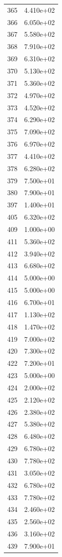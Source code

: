 \documentclass[12pt]{article}
\begin{document}
\begin{longtable}{@{}cc@{}}
365 & 4.410e+02 \\
366 & 6.050e+02 \\
367 & 5.580e+02 \\
368 & 7.910e+02 \\
369 & 6.310e+02 \\
370 & 5.130e+02 \\
371 & 5.360e+02 \\
372 & 4.970e+02 \\
373 & 4.520e+02 \\
374 & 6.290e+02 \\
375 & 7.090e+02 \\
376 & 6.970e+02 \\
377 & 4.410e+02 \\
378 & 6.280e+02 \\
379 & 7.500e+01 \\
380 & 7.900e+01 \\
397 & 1.400e+01 \\
405 & 6.320e+02 \\
409 & 1.000e+00 \\
411 & 5.360e+02 \\
412 & 3.940e+02 \\
413 & 6.680e+02 \\
414 & 5.000e+00 \\
415 & 5.000e+00 \\
416 & 6.700e+01 \\
417 & 1.130e+02 \\
418 & 1.470e+02 \\
419 & 7.000e+02 \\
420 & 7.300e+02 \\
422 & 7.200e+01 \\
423 & 5.000e+00 \\
424 & 2.000e+02 \\
425 & 2.120e+02 \\
426 & 2.380e+02 \\
427 & 5.380e+02 \\
428 & 6.480e+02 \\
429 & 6.780e+02 \\
430 & 7.780e+02 \\
431 & 3.050e+02 \\
432 & 6.780e+02 \\
433 & 7.780e+02 \\
434 & 2.460e+02 \\
435 & 2.560e+02 \\
436 & 3.160e+02 \\
439 & 7.900e+01 \\

\end{longtable}
\end{document}
